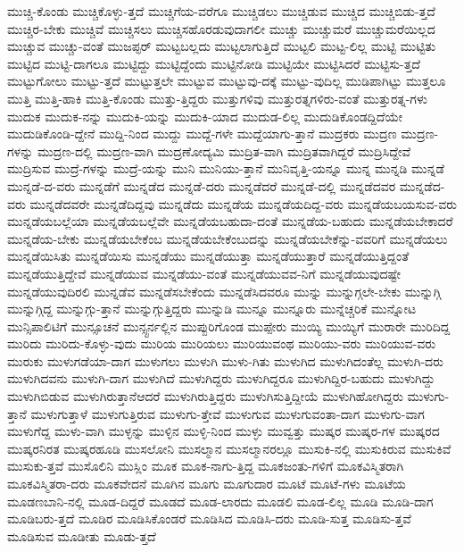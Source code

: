 {ಮುಚ್ಚಿ-ಕೊಂಡು
ಮುಚ್ಚಿಕೊಳ್ಳು-ತ್ತದೆ
ಮುಚ್ಚಿಗೆಯ-ವರೆಗೂ
ಮುಚ್ಚಿಡಲು
ಮುಚ್ಚಿಡುವ
ಮುಚ್ಚಿದ
ಮುಚ್ಚಿಬಿಡು-ತ್ತದೆ
ಮುಚ್ಚಿರ-ಬೇಕು
ಮುಚ್ಚಿವೆ
ಮುಚ್ಚಿಸಲು
ಮುಚ್ಚಿಸಹೊರಡುವುದಾಗಲೀ
ಮುಚ್ಚು
ಮುಚ್ಚುಮರೆ
ಮುಚ್ಚುಮರೆಯಿಲ್ಲದ
ಮುಚ್ಚುವ
ಮುಚ್ಚು-ವಂತೆ
ಮುಜಪ್ಫರ್
ಮುಟ್ಟಬಲ್ಲದು
ಮುಟ್ಟಲಾಗುತ್ತಿದೆ
ಮುಟ್ಟಲಿ
ಮುಟ್ಟ-ಲಿಲ್ಲ
ಮುಟ್ಟಿ
ಮುಟ್ಟಿತು
ಮುಟ್ಟಿದ
ಮುಟ್ಟಿ-ದಾಗಲೂ
ಮುಟ್ಟಿದ್ದು
ಮುಟ್ಟಿದ್ದೆಂದು
ಮುಟ್ಟಿನೋಡಿ
ಮುಟ್ಟಿಯೇ
ಮುಟ್ಟಿಸಿದರೆ
ಮುಟ್ಟಿಸು-ತ್ತದೆ
ಮುಟ್ಟುಗೋಲು
ಮುಟ್ಟು-ತ್ತದೆ
ಮುಟ್ಟುತ್ತಲೇ
ಮುಟ್ಟುವ
ಮುಟ್ಟುವು-ದಕ್ಕೆ
ಮುಟ್ಟು-ವುದಿಲ್ಲ
ಮುಡಿಪಾಗಿಟ್ಟು
ಮುತ್ತಲೂ
ಮುತ್ತಿ
ಮುತ್ತಿ-ಹಾಕಿ
ಮುತ್ತಿ-ಕೊಂಡು
ಮುತ್ತು-ತ್ತಿದ್ದರು
ಮುತ್ತುಗಳಿವು
ಮುತ್ತುರತ್ನಗಳಿರು-ವಂತೆ
ಮುತ್ತುರತ್ನ-ಗಳು
ಮುದುಕ
ಮುದುಕ-ನನ್ನು
ಮುದುಕಿ-ಯನ್ನು
ಮುದುಕಿ-ಯಾದ
ಮುದುಡ-ಲಿಲ್ಲ
ಮುದುಡಿಕೊಂಡದ್ದಿದೆಯೇ
ಮುದುಡಿಕೊಂಡಿ-ದ್ದೇನೆ
ಮುದ್ದಿ-ನಿಂದ
ಮುದ್ದು
ಮುದ್ದೆ-ಗಳೇ
ಮುದ್ದೆಯಾಗು-ತ್ತಾನೆ
ಮುದ್ರಕರು
ಮುದ್ರಣ
ಮುದ್ರಣ-ಗಳನ್ನು
ಮುದ್ರಣ-ದಲ್ಲಿ
ಮುದ್ರಣ-ವಾಗಿ
ಮುದ್ರಣೋದ್ಯಮಿ
ಮುದ್ರಿತ-ವಾಗಿ
ಮುದ್ರಿತವಾಗಿದ್ದರೆ
ಮುದ್ರಿಸಿದ್ದೇವೆ
ಮುದ್ರಿಸುವ
ಮುದ್ರೆ-ಗಳನ್ನು
ಮುದ್ರೆ-ಯನ್ನು
ಮುನಿ
ಮುನಿಯು-ತ್ತಾನೆ
ಮುನಿವೃತ್ತಿ-ಯನ್ನೂ
ಮುನ್ನ
ಮುನ್ನಡಿ
ಮುನ್ನಡೆ
ಮುನ್ನಡೆ-ದ-ವರು
ಮುನ್ನಡೆಗೆ
ಮುನ್ನಡೆದ
ಮುನ್ನಡೆ-ದರು
ಮುನ್ನಡೆದರೆ
ಮುನ್ನಡೆ-ದಲ್ಲಿ
ಮುನ್ನಡೆದವರ
ಮುನ್ನಡೆದ-ವರು
ಮುನ್ನಡೆದವರೇ
ಮುನ್ನಡೆದಿದ್ದವು
ಮುನ್ನಡೆದು
ಮುನ್ನಡೆಯ
ಮುನ್ನಡೆಯದಿದ್ದ-ವರು
ಮುನ್ನಡೆಯಬಯಸುವ-ವರು
ಮುನ್ನಡೆಯಬಲ್ಲೆಯಾ
ಮುನ್ನಡೆಯಬಲ್ಲೆವೇ
ಮುನ್ನಡೆಯಬಹುದಾ-ದಂತೆ
ಮುನ್ನಡೆಯ-ಬಹುದು
ಮುನ್ನಡೆಯಬೇಕಾದರೆ
ಮುನ್ನಡೆಯ-ಬೇಕು
ಮುನ್ನಡೆಯಬೇಕೆಂಬ
ಮುನ್ನಡೆಯಬೇಕೆಂಬುದನ್ನು
ಮುನ್ನಡೆಯಬೇಕೆನ್ನು-ವವರಿಗೆ
ಮುನ್ನಡೆಯಲು
ಮುನ್ನಡೆಯಿಸಿತು
ಮುನ್ನಡೆಯಿಸು
ಮುನ್ನಡೆಯು
ಮುನ್ನಡೆಯುತ್ತಾ
ಮುನ್ನಡೆಯುತ್ತಾರೆ
ಮುನ್ನಡೆಯುತ್ತಿದ್ದಂತೆ
ಮುನ್ನಡೆಯುತ್ತಿದ್ದೇವೆ
ಮುನ್ನಡೆಯುವ
ಮುನ್ನಡೆಯು-ವಂತೆ
ಮುನ್ನಡೆಯುವವ-ನಿಗೆ
ಮುನ್ನಡೆಯುವುದಷ್ಟೇ
ಮುನ್ನಡೆಯುವುದಿರಲಿ
ಮುನ್ನಡೆವ
ಮುನ್ನಡೆಸಬೇಕೆಂದು
ಮುನ್ನಡೆಸಿದವರೂ
ಮುನ್ನು
ಮುನ್ನುಗ್ಗಲೇ-ಬೇಕು
ಮುನ್ನುಗ್ಗಿ
ಮುನ್ನುಗ್ಗಿದ್ದ
ಮುನ್ನುಗ್ಗು-ತ್ತಾನೆ
ಮುನ್ನುಗ್ಗುತ್ತಿದ್ದರು
ಮುನ್ನುಡಿ
ಮುನ್ನೂ
ಮುನ್ನೂರು
ಮುನ್ನೆಚ್ಚರಿಕೆ
ಮುನ್ನೋಟ
ಮುನ್ಸಿಪಾಲಿಟಿಗೆ
ಮುನ್ಸೂಚನೆ
ಮುನ್ಸ್ಟರ್ನಲ್ಲಿನ
ಮುಪ್ಪುರಿಗೊಂಡ
ಮುಪ್ಪೇರು
ಮುಯ್ಯಿ
ಮುಯ್ಯಿಗೆ
ಮುರಾರೇ
ಮುರಿದಿದ್ದ
ಮುರಿದು
ಮುರಿದು-ಕೊಳ್ಳು-ವುದು
ಮುರಿಯ
ಮುರಿಯಲು
ಮುರಿಯುವಂಥ
ಮುರಿಯು-ವರು
ಮುರಿಯುವ-ವರು
ಮುರುಕು
ಮುಳುಗಡೆಯಾ-ದಾಗ
ಮುಳುಗಲು
ಮುಳುಗಿ
ಮುಳು-ಗಿತು
ಮುಳುಗಿದ
ಮುಳುಗಿದಂತೆಲ್ಲ
ಮುಳುಗಿ-ದರು
ಮುಳುಗಿದವನು
ಮುಳುಗಿ-ದಾಗ
ಮುಳುಗಿದೆ
ಮುಳುಗಿದ್ದರು
ಮುಳುಗಿದ್ದರೂ
ಮುಳುಗಿದ್ದಿರ-ಬಹುದು
ಮುಳುಗಿದ್ದು
ಮುಳುಗಿಬಿಡುವ
ಮುಳುಗಿರುತ್ತಾನೆಆದರೆ
ಮುಳುಗಿರುತ್ತಿದ್ದರು
ಮುಳುಗಿಸುತ್ತಿದ್ದೀಯೆ
ಮುಳುಗಿಹೋಗಿದ್ದರು
ಮುಳುಗು-ತ್ತಾನೆ
ಮುಳುಗುತ್ತಾಳೆ
ಮುಳುಗುತ್ತಿರುವ
ಮುಳುಗು-ತ್ತೇವೆ
ಮುಳುಗುವ
ಮುಳುಗುವಂತಾ-ದಾಗ
ಮುಳುಗು-ವಾಗ
ಮುಳುಗೆದ್ದ
ಮುಳು-ವಾಗಿ
ಮುಳ್ಳನ್ನು
ಮುಳ್ಳಿನ
ಮುಳ್ಳಿ-ನಿಂದ
ಮುಳ್ಳು
ಮುವ್ವತ್ತು
ಮುಷ್ಕರ
ಮುಷ್ಕರ-ಗಳ
ಮುಷ್ಕರದ
ಮುಷ್ಕರನಿರತ
ಮುಷ್ಕರಹೂಡಿ
ಮುಸಲೋನಿ
ಮುಸಲ್ಮಾನ
ಮುಸಲ್ಮಾನರಲ್ಲೂ
ಮುಸುಕಿ-ನಲ್ಲಿ
ಮುಸುಕಿರುವ
ಮುಸುಕಿವೆ
ಮುಸುಕು-ತ್ತವೆ
ಮುಸೊಲಿನಿ
ಮುಸ್ಲಿಂ
ಮೂಕ
ಮೂಕ-ನಾಗು-ತ್ತಿದ್ದ
ಮೂಕಜಂತು-ಗಳಿಗೆ
ಮೂಕವಿಸ್ಮಿತರಾಗಿ
ಮೂಕವಿಸ್ಮಿತರಾ-ದರು
ಮೂಕವೇದನೆ
ಮೂಗಿನ
ಮೂಗು
ಮೂಗುದಾರ
ಮೂಟೆ
ಮೂಟೆ-ಗಳು
ಮೂಟೆಯ
ಮೂಡಣಬಾನಿ-ನಲ್ಲಿ
ಮೂಡ-ದಿದ್ದರೆ
ಮೂಡದೆ
ಮೂಡ-ಲಾರದು
ಮೂಡಲಿ
ಮೂಡ-ಲಿಲ್ಲ
ಮೂಡಿ
ಮೂಡಿ-ದಾಗ
ಮೂಡಿಬರು-ತ್ತದೆ
ಮೂಡಿರ
ಮೂಡಿಸಿಕೊಂಡರೆ
ಮೂಡಿಸಿದ
ಮೂಡಿಸಿ-ದರು
ಮೂಡಿ-ಸುತ್ತ
ಮೂಡಿಸು-ತ್ತವೆ
ಮೂಡಿಸುವ
ಮೂಡೀತು
ಮೂಡು-ತ್ತದೆ
}
